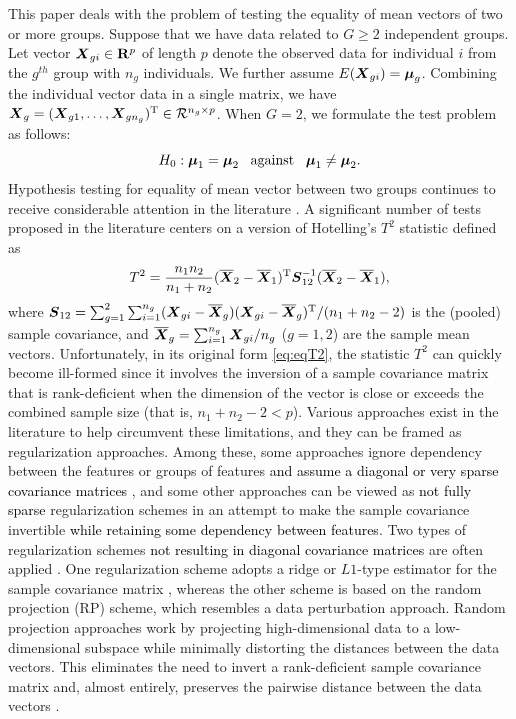 \documentclass[APA,Times1COL]{WileyNJDv5} %
\def\be{\begin{eqnarray}}
\def\ee{\end{eqnarray}}
\def\trans{^{\rm T}}
\newcommand{\uS}       {\mbox{\boldmath$S$}}
\newcommand{\uX}       {\mbox{\boldmath$X$}}
\newcommand{\umu}               {\mbox{\boldmath$\mu$}}
\begin{document}
This paper deals with the problem of testing the equality of mean vectors of two or more groups. Suppose that we have data related to $G \geq 2$ independent groups. Let vector $\uX_{gi} \in \mathbf{R}^{p}$ of length $p$ denote the observed data for individual $i$ from the $g^{th}$ group with $n_{g}$ individuals. We further assume $E(\uX_{gi}) = \umu_g$.  
Combining the individual vector data in a single matrix, we have $\uX_{g} = (\uX_{g1}, \ldots, \uX_{gn_g})\trans \in \mathcal{R}^{n_g \times p}$. When $G=2$, we formulate the test problem as follows:
$$ H_{0}: \umu_1 = \umu_2\;\;\;\mbox{against}\;\;\;  \umu_1 \neq \umu_2.  $$
Hypothesis testing for equality of mean vector between two groups continues to receive considerable attention in the literature \citep{zhang2019more,chen2019two}. A significant number of tests proposed in the literature centers on a version of Hotelling's $T^2$ statistic defined as
\be
T^{2} = \frac{n_1n_2}{n_1 + n_2}(\overline{\uX}_2 - \overline{\uX}_1)\trans\uS^{-1}_{12} (\overline{\uX}_2 - \overline{\uX}_1), \label{eq:eqT2}
\ee
where $\uS_{12} = \sum^{2}_{g=1}\sum^{n_g}_{i=1}(\uX_{gi} - \overline{\uX}_g)(\uX_{gi} - \overline{\uX}_g)\trans /(n_1+n_2 - 2)$ is the (pooled) sample covariance, and $\overline{\uX}_g = \sum^{n_g}_{i=1}\uX_{gi}/n_g$ ($g = 1,2$) are the sample mean vectors.
Unfortunately, in its original form \eqref{eq:eqT2}, the statistic $T^2$ can quickly become ill-formed since it involves the inversion of a sample covariance matrix that is rank-deficient when the dimension of the vector is close or exceeds the combined sample size (that is, $n_1+n_2-2 < p$). Various approaches exist in the literature to help circumvent these limitations, and they can be framed as regularization approaches. Among these, some approaches ignore dependency between the features or groups of features \textcolor{black}{and assume a diagonal or very sparse covariance matrices} \citep{bai1996effect,chen2010two,ahmad2014u,feng2017composite}, and some other approaches can be viewed as \textcolor{black}{not fully sparse} regularization schemes in an attempt to make the sample covariance invertible \textcolor{black}{while retaining some dependency between features}. Two types of regularization schemes \textcolor{black}{not resulting in diagonal covariance matrices} are often applied \citep{hu2020pairwise}. One regularization scheme adopts a ridge or $L1$-type estimator for the sample covariance matrix \citep{chen2011regularized,li2020adaptable}, whereas the other scheme is based on the random projection (RP) scheme, which resembles a data perturbation approach. Random projection approaches work by projecting high-dimensional data to a low-dimensional subspace while minimally distorting the distances between the data vectors. This eliminates the need to invert a rank-deficient sample covariance matrix and, almost entirely, preserves the pairwise distance between the data vectors \citep{johnson84extensionslipschitz}. 
\end{document}
